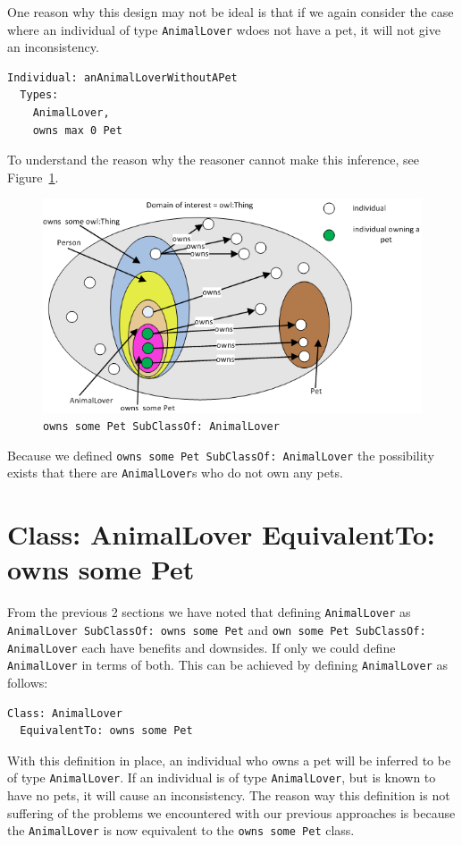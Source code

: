\documentclass{amsart}
\begin{document}
One reason why this design may not be ideal is that if we again consider the case where an individual of type \texttt{AnimalLover} wdoes not have a pet, it will not give an inconsistency. 
\begin{small}
\begin{verbatim} 
Individual: anAnimalLoverWithoutAPet
  Types: 
    AnimalLover, 
    owns max 0 Pet
\end{verbatim}
\end{small} 
To understand the reason why the reasoner cannot make this inference, see Figure~\ref{fig_OwnsSomePetSubclassAnimalLover}.
    \begin{figure}
      \centering \includegraphics[trim = 0mm 0mm 0mm 0mm, clip, scale=0.6]{./OwnsSomePetSubclassAnimalLover.png}
      \caption{\texttt{owns some Pet SubClassOf: AnimalLover}}\label{fig_OwnsSomePetSubclassAnimalLover}
    \end{figure} 
Because we defined \texttt{owns some Pet SubClassOf: AnimalLover} the possibility exists that there are \texttt{AnimalLover}s who do not own any pets.

  \section{Class: AnimalLover EquivalentTo: owns some Pet}
 From the previous 2 sections we have noted that defining \texttt{AnimalLover} as \texttt{AnimalLover SubClassOf: owns some Pet} and 
 \texttt{own some Pet SubClassOf: AnimalLover} each have benefits and downsides. If only we could define \texttt{AnimalLover} in terms of both. This can be achieved by defining \texttt{AnimalLover} as follows:
\begin{small}
\begin{verbatim} 
Class: AnimalLover
  EquivalentTo: owns some Pet
\end{verbatim}
\end{small}  
With this definition in place, an individual who owns a pet will be inferred to be of type \texttt{AnimalLover}. If an individual is of type \texttt{AnimalLover}, but is known to have no pets, it will cause an inconsistency. The reason way this definition is not suffering of the problems we encountered with our previous approaches is because the \texttt{AnimalLover} is now equivalent to the  \texttt{owns some Pet} class.
\end{document}
